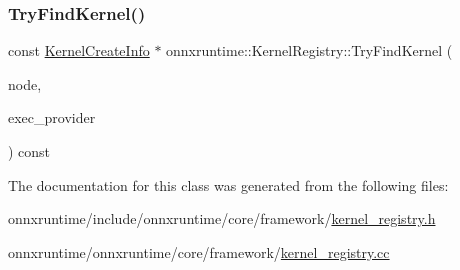 \subsubsection{\texorpdfstring{Try\+Find\+Kernel()}{TryFindKernel()}}
{\footnotesize\ttfamily const \mbox{\hyperlink{structonnxruntime_1_1KernelCreateInfo}{Kernel\+Create\+Info}} $\ast$ onnxruntime\+::\+Kernel\+Registry\+::\+Try\+Find\+Kernel (\begin{DoxyParamCaption}\item[{const \mbox{\hyperlink{classonnxruntime_1_1Node}{onnxruntime\+::\+Node}} \&}]{node,  }\item[{\mbox{\hyperlink{namespaceonnxruntime_a863e2227cbf32aab76aad35fdadff4bb}{onnxruntime\+::\+Provider\+Type}}}]{exec\+\_\+provider }\end{DoxyParamCaption}) const}



The documentation for this class was generated from the following files\+:\begin{DoxyCompactItemize}
\item 
onnxruntime/include/onnxruntime/core/framework/\mbox{\hyperlink{kernel__registry_8h}{kernel\+\_\+registry.\+h}}\item 
onnxruntime/onnxruntime/core/framework/\mbox{\hyperlink{kernel__registry_8cc}{kernel\+\_\+registry.\+cc}}\end{DoxyCompactItemize}

